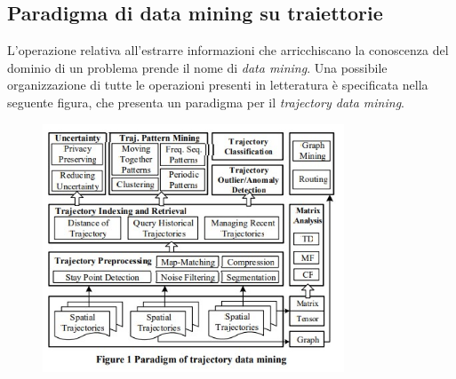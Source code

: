 \documentclass[12pt]{article}
\begin{document}
\subsection{Paradigma di data mining su traiettorie}
L'operazione relativa all'estrarre informazioni che arricchiscano la conoscenza del dominio di un problema prende il nome di \textit{data mining}. Una possibile organizzazione di tutte le operazioni presenti in letteratura è specificata nella seguente figura, che presenta un paradigma per il \textit{trajectory data mining}.
\begin{figure}[htb!]
    \centering
    \includegraphics[width=0.8\textwidth]{images/datamining.jpg}
\end{figure}
\FloatBarrier
\end{document}
